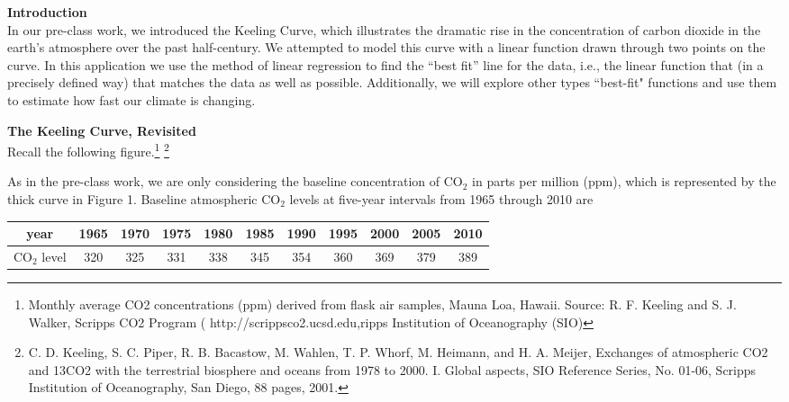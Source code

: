 \documentclass[11pt]{article}
\begin{document}
\pagestyle{otherpages}
\thispagestyle{firstpage}
\vspace*{.85in}


{\bf Introduction}\\

In our pre-class work, we introduced the Keeling Curve, which illustrates the dramatic rise in the concentration of carbon dioxide in the earth's atmosphere over the past half-century. We  attempted to model this curve with a linear function drawn through two points on the curve. In this application we use the method of linear regression to find the ``best fit'' line for the data, i.e., the linear function that (in a precisely defined way) that matches the data as well as possible. Additionally, we will explore other types ``best-fit" functions and use them to estimate how fast our climate is changing.

\vspace{0.5cm}


{\bf The Keeling Curve, Revisited}\\


Recall the following figure.\footnote{Monthly average CO2 concentrations (ppm) derived from flask air samples,  Mauna Loa, Hawaii. Source: R. F. Keeling and S. J. Walker, Scripps CO2 Program ( http://scrippsco2.ucsd.edu,ripps Institution of Oceanography (SIO) } 
\footnote{ C. D. Keeling, S. C. Piper, R. B. Bacastow, M. Wahlen, T. P. Whorf, M. Heimann, and   H. A. Meijer, Exchanges of atmospheric CO2 and 13CO2 with the terrestrial biosphere and   oceans from 1978 to 2000.  I. Global aspects, SIO Reference Series, No. 01-06, Scripps   Institution of Oceanography, San Diego, 88 pages, 2001. }\.\\



\vspace{0.2cm}

As in the pre-class work, we are only considering the baseline concentration of CO$_2$ in parts per million (ppm), which is represented by the thick curve in Figure 1.  Baseline atmospheric CO$_2$ levels at five-year intervals from 1965 through 2010 are
\begin{center}
\begin{tabular}{|c|c|c|c|c|c|c|c|c|c|c|}
\hline
year & 1965 & 1970 & 1975 & 1980 & 1985 & 1990 & 1995 & 2000 & 2005 & 2010 \\
\hline
CO$_2$ level & 320 & 325 & 331 & 338 & 345 & 354 & 360 & 369 & 379 & 389 \\
\hline
\end{tabular}
\end{center}
\end{document}
